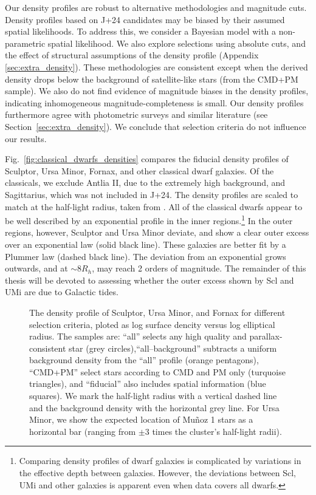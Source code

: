 Our density profiles are robust to alternative methodologies and
magnitude cuts. Density profiles based on J+24 candidates may be biased
by their assumed spatial likelihoods. To address this, we consider a
Bayesian model with a non-parametric spatial likelihood. We also explore
selections using absolute cuts, and the effect of structural assumptions
of the density profile (Appendix \ref{sec:extra_density}). These
methodologies are consistent except when the derived density drops below
the background of satellite-like stars (from the CMD+PM sample). We also
do not find evidence of magnitude biases in the density profiles,
indicating inhomogeneous magnitude-completeness is small. Our density
profiles furthermore agree with photometric surveys and similar
literature (see Section~\ref{sec:extra_density}). We conclude that
selection criteria do not influence our results.

Fig.~\ref{fig:classical_dwarfs_densities} compares the fiducial density
profiles of Sculptor, Ursa Minor, Fornax, and other classical dwarf
galaxies. Of the classicals, we exclude Antlia II, due to the extremely
high background, and Sagittarius, which was not included in J+24. The
density profiles are scaled to match at the half-light radius, taken
from \citet{munoz+2018}. All of the classical dwarfs appear to be well
described by an exponential profile in the inner regions.\footnote{Comparing
  density profiles of dwarf galaxies is complicated by variations in the
  effective depth between galaxies. However, the deviations between Scl,
  UMi and other galaxies is apparent even when data covers all dwarfs.}
In the outer regions, however, Sculptor and Ursa Minor deviate, and show
a clear outer excess over an exponential law (solid black line). These
galaxies are better fit by a Plummer law (dashed black line). The
deviation from an exponential grows outwards, and at \(\sim 8 R_h\), may
reach 2 orders of magnitude. The remainder of this thesis will be
devoted to assessing whether the outer excess shown by Scl and UMi are
due to Galactic tides.

\begin{figure}
\centering
{}
\caption[Density profiles for different Gaia samples]{The density
profile of Sculptor, Ursa Minor, and Fornax for different selection
criteria, ploted as log surface dencity versus log elliptical radius.
The samples are: ``all'' selects any high quality and
parallax-consistent star (grey circles),``all--background'' subtracts a
uniform background density from the ``all'' profile (orange pentagons),
``CMD+PM'' select stars according to CMD and PM only (turquoise
triangles), and ``fiducial'' also includes spatial information (blue
squares). We mark the half-light radius with a vertical dashed line and
the background density with the horizontal grey line. For Ursa Minor, we
show the expected location of Muñoz 1 stars as a horizontal bar (ranging
from \(\pm3\) times the cluster's half-light
radii).}\label{fig:scl_observed_profiles}
\end{figure}

